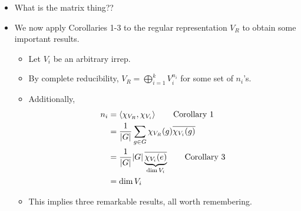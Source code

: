 \documentclass[../notes.tex]{subfiles}
\begin{document}
\begin{itemize}
\begin{equation*}
\begin{cases}
            |G| & g=e
        \end{cases}
    \end{equation*}
    \begin{proof}
        We can compute its character $\chi_{V_R}$ by considering the corresponding permutation matrices. Indeed, the action $\chi_{V_R}(g)$ of this character on $g$ is equal to the number of 1's on the diagonal in the permuttion matrix, which is equal to the number of fixed points of the permutation, i.e., the number of $i$'s such that $gg_i=g_i$. But in a group, $gg_i=g_i$ iff $g=e$, so this number of fixed points is
        \begin{equation*}
            \chi_{V_R}(g) = \Fix(g)
            =
            \begin{pmatrix}
                g_1 & \cdots & g_n\\
                gg_1 & \cdots & gg_n\\
            \end{pmatrix}
            =
            \begin{cases}
                0 & g\neq e\\
                |G| & g=e
            \end{cases}
        \end{equation*}
        as desired.
    \end{proof}
    \item What is the matrix thing??
    \item We now apply Corollaries 1-3 to the regular representation $V_R$ to obtain some important results.
    \begin{itemize}
        \item Let $V_i$ be an arbitrary irrep.
        \item By complete reducibility, $V_R=\bigoplus_{i=1}^kV_i^{n_i}$ for some set of $n_i$'s.
        \item Additionally,
        \begin{align*}
            n_i &= \left\langle{\chi_{V_R},\chi_{V_i}}\right\rangle\tag*{Corollary 1}\\
            &= \frac{1}{|G|}\sum_{g\in G}\chi_{V_R}(g)\overline{\chi_{V_i}(g)}\\
            &= \frac{1}{|G|}|G|\underbrace{\overline{\chi_{V_i}(e)}}_{\dim V_i}\tag*{Corollary 3}\\
            &= \dim V_i
        \end{align*}
        \item This implies three remarkable results, all worth remembering.

\end{itemize}
\end{itemize}
\end{document}
